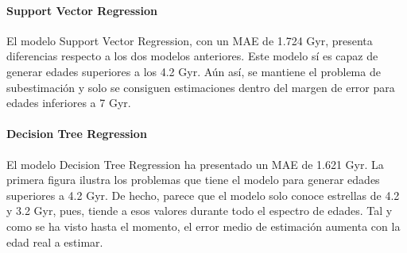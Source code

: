 \paragraph{Support Vector Regression} 
El modelo Support Vector Regression, con un MAE de 1.724 Gyr, presenta diferencias respecto a los dos modelos anteriores. Este modelo sí es capaz de generar edades superiores a los 4.2 Gyr. Aún así, se mantiene el problema de subestimación y solo se consiguen estimaciones dentro del margen de error para edades inferiores a 7 Gyr. %

\paragraph{Decision Tree Regression} 
El modelo Decision Tree Regression ha presentado un MAE de 1.621 Gyr. La primera figura ilustra los problemas que tiene el modelo para generar edades superiores a 4.2 Gyr. De hecho, parece que el modelo solo conoce estrellas de 4.2 y 3.2 Gyr, pues, tiende a esos valores durante todo el espectro de edades. Tal y como se ha visto hasta el momento, el error medio de estimación aumenta con la edad real a estimar. %


